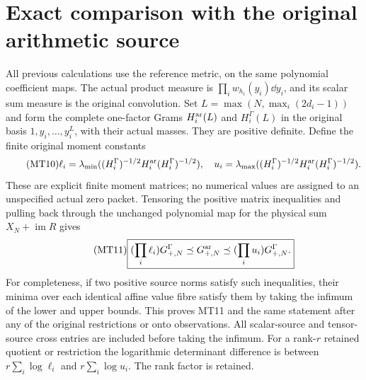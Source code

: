 \documentclass[11pt]{article}
\newcommand{\im}{\operatorname{im}}
\begin{document}
\section{Exact comparison with the original arithmetic source}
All previous calculations use the reference metric, on the same
polynomial coefficient maps. The actual product measure is
$\prod_i w_{h_i}(y_i)\dd y_i$, and its scalar sum measure is the
original convolution. Set $L=\max(N,\max_i(2d_i-1))$ and form the
complete one-factor Grams $H_i^{\rm ar}(L)$ and $H_i^\Gamma(L)$ in
the original basis $1,y_i,\ldots,y_i^L$, with their actual masses.
They are positive definite. Define the finite original moment constants
\begin{equation}\tag{MT10}
 \ell_i=\lambda_{\min}((H_i^\Gamma)^{-1/2}H_i^{\rm ar}(H_i^\Gamma)^{-1/2}),
 \quad u_i=\lambda_{\max}((H_i^\Gamma)^{-1/2}H_i^{\rm ar}(H_i^\Gamma)^{-1/2}).
\end{equation}
These are explicit finite moment matrices; no numerical values are
assigned to an unspecified actual zero packet. Tensoring the positive
matrix inequalities and pulling back through the unchanged polynomial
map for the physical sum $X_N+\im R$ gives
\begin{equation}\tag{MT11}\boxed{
 (\prod_i\ell_i)G^\Gamma_{+,N}
 \preceq G^{\rm ar}_{+,N}\preceq
 (\prod_i u_i)G^\Gamma_{+,N}.}
\end{equation}
For completeness, if two positive source norms satisfy such inequalities,
their minima over each identical affine value fibre satisfy them by
taking the infimum of the lower and upper bounds. This proves MT11
and the same statement after any of the original restrictions or onto
observations. All scalar-source and tensor-source cross entries are
included before taking the infimum. For a rank-$r$ retained quotient
or restriction the logarithmic determinant difference is between
$r\sum_i\log\ell_i$ and $r\sum_i\log u_i$. The rank factor is retained.
\end{document}
